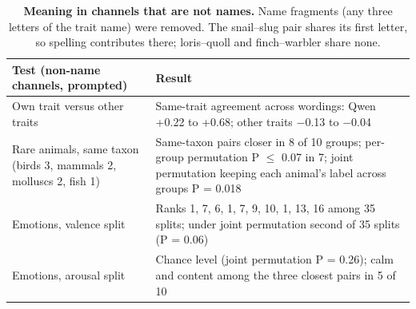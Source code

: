 \begin{table}[tp]
\caption{\textbf{Meaning in channels that are not names.} Name fragments (any three letters of the trait name) were removed. The snail--slug pair shares its first letter, so spelling contributes there; loris--quoll and finch--warbler share none.}
\label{sitab:4}
{\tabsize\setlength{\tabcolsep}{4pt}
\begin{tabular}{@{}>{\raggedright\arraybackslash}p{0.485\dimexpr\textwidth-2\tabcolsep\relax}>{\raggedright\arraybackslash}p{0.515\dimexpr\textwidth-2\tabcolsep\relax}@{}}
\toprule
\textbf{Test (non-name channels, prompted)} & \textbf{Result}\\
\midrule
Own trait versus other traits & Same-trait agreement across wordings: Qwen +0.22 to +0.68; other traits $-$0.13 to $-$0.04\\
Rare animals, same taxon (birds 3, mammals 2, molluscs 2, fish 1) & Same-taxon pairs closer in 8 of 10 groups; per-group permutation P $\leq$ 0.07 in 7; joint permutation keeping each animal's label across groups P = 0.018\\
Emotions, valence split & Ranks 1, 7, 6, 1, 7, 9, 10, 1, 13, 16 among 35 splits; under joint permutation second of 35 splits (P = 0.06)\\
Emotions, arousal split & Chance level (joint permutation P = 0.26); calm and content among the three closest pairs in 5 of 10\\
\bottomrule
\end{tabular}}
\end{table}


